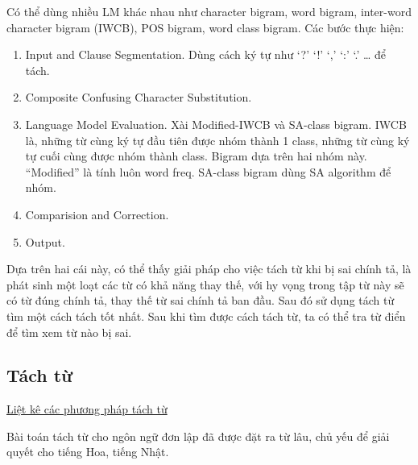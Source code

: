 \documentclass[a4paper,oneside]{book} %
\newcommand{\note}[1]{\underline{#1}}
\begin{document}
\cite{Chang} Có thể dùng nhiều LM khác nhau như character
bigram, word bigram, inter-word character bigram (IWCB), POS bigram,
word class bigram. Các bước thực hiện:
\begin{enumerate}
\item Input and Clause Segmentation. Dùng cách ký tự như `?' `!' `,'
  `:' `.' \ldots{} để tách.
\item Composite Confusing Character Substitution. 
\item Language Model Evaluation. Xài Modified-IWCB và SA-class
  bigram. IWCB là, những từ cùng ký tự đầu tiên được nhóm thành 1
  class, những từ cùng ký tự cuối cùng được nhóm thành class. Bigram
  dựa trên hai nhóm này. ``Modified'' là tính luôn word freq. SA-class
  bigram dùng SA algorithm để nhóm.
\item Comparision and Correction.
\item Output.
\end{enumerate}


Dựa trên hai cái này, có thể thấy giải pháp cho việc tách từ khi bị
sai chính tả, là phát sinh một loạt các từ có khả năng thay thế, với
hy vọng trong tập từ này sẽ có từ đúng chính tả, thay thế từ sai chính
tả ban đầu. Sau đó sử dụng tách từ tìm một cách tách tốt nhất. Sau khi
tìm được cách tách từ, ta có thể tra từ điển để tìm xem từ nào bị sai.


\subsection{Tách từ}

\note{Liệt kê các phương pháp tách từ}

Bài toán tách từ cho ngôn ngữ đơn lập đã được đặt ra từ lâu, chủ yếu
để giải quyết cho tiếng Hoa, tiếng Nhật. 
\end{document}
